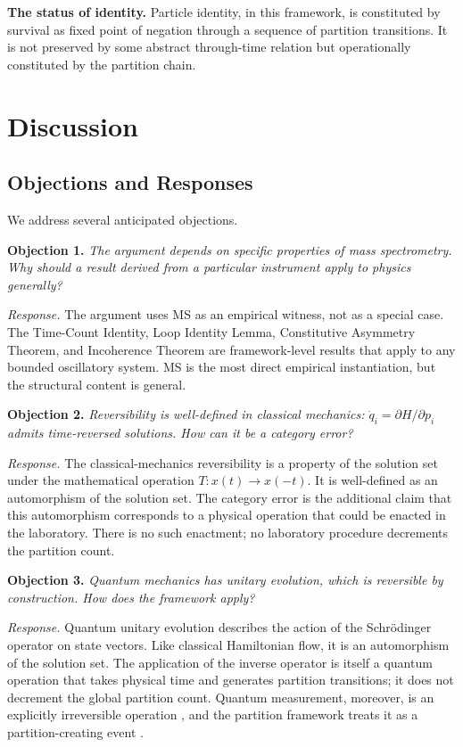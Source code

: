 \documentclass[twocolumn,10pt,a4paper]{article}
\theoremstyle{definition}
\theoremstyle{remark}
\begin{document}
\textbf{The status of identity.} Particle identity, in this framework, is constituted by survival as fixed point of negation through a sequence of partition transitions. It is not preserved by some abstract through-time relation but operationally constituted by the partition chain.

\section{Discussion}
\label{sec:discussion}

\subsection{Objections and Responses}

We address several anticipated objections.

\textbf{Objection 1.} \emph{The argument depends on specific properties of mass spectrometry. Why should a result derived from a particular instrument apply to physics generally?}

\emph{Response.} The argument uses MS as an empirical witness, not as a special case. The Time-Count Identity, Loop Identity Lemma, Constitutive Asymmetry Theorem, and Incoherence Theorem are framework-level results that apply to any bounded oscillatory system. MS is the most direct empirical instantiation, but the structural content is general.

\textbf{Objection 2.} \emph{Reversibility is well-defined in classical mechanics: $\dot{q}_i = \partial H/\partial p_i$ admits time-reversed solutions. How can it be a category error?}

\emph{Response.} The classical-mechanics reversibility is a property of the solution set under the mathematical operation $T: x(t) \to x(-t)$. It is well-defined as an automorphism of the solution set. The category error is the additional claim that this automorphism corresponds to a physical operation that could be enacted in the laboratory. There is no such enactment; no laboratory procedure decrements the partition count.

\textbf{Objection 3.} \emph{Quantum mechanics has unitary evolution, which is reversible by construction. How does the framework apply?}

\emph{Response.} Quantum unitary evolution describes the action of the Schrödinger operator on state vectors. Like classical Hamiltonian flow, it is an automorphism of the solution set. The application of the inverse operator is itself a quantum operation that takes physical time and generates partition transitions; it does not decrement the global partition count. Quantum measurement, moreover, is an explicitly irreversible operation \citep{vonneumann1932}, and the partition framework treats it as a partition-creating event \citep{sachikonye2025loschmidt}.
\end{document}

